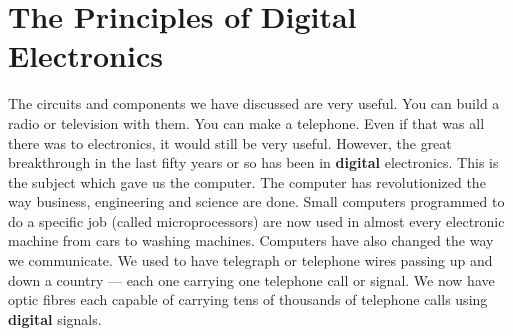 \section{The Principles of Digital Electronics}

The circuits and components we have discussed are very useful.  You can build a radio or television with them.  You can make a telephone.  Even if that was all there was to electronics, it would still be very useful.  However, the great breakthrough in the last fifty years or so has been in {\bf digital} electronics.  This is the subject which gave us the computer.  The computer has revolutionized the way business, engineering and science are done.  Small computers programmed to do a specific job (called microprocessors) are now used in almost every electronic machine from cars to washing machines.  Computers have also changed the way we communicate.  We used to have telegraph or telephone wires passing up and down a country --- each one carrying one telephone call or signal.  We now have optic fibres each capable of carrying tens of thousands of telephone calls using {\bf digital} signals.


